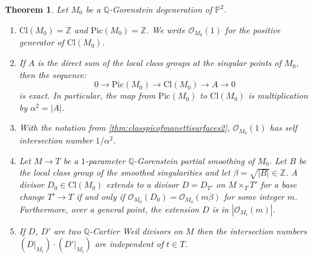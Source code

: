 \documentclass[11pt]{article}
\theoremstyle{plain}
\newtheorem{theorem}{Theorem}[section]
\theoremstyle{definition}
\newcommand\PP{{\mathbb{P}}}
\newcommand\QQ{{\mathbb Q}}
\newcommand\ZZ{{\mathbb Z}}
\newcommand\Oc{{\mathcal O}}
\newcommand\Cl{{\mathrm{Cl}}}
\newcommand\Pic{{\mathrm{Pic}}}
\begin{document}
\begin{theorem}\label{thm:classpicofmanettisurfaces} Let $M_0$ be a $\QQ$-Gorenstein degeneration of $\PP^2$.
\begin{enumerate}
\item\label{thm:classpicofmanettisurfaces1}
$\Cl(M_0)=\ZZ$ and $\Pic(M_0)=\ZZ$. We write $\Oc_{M_0}(1)$ for the positive generator of $\Cl(M_0)$.
\item\label{thm:classpicofmanettisurfaces2}
If $A$ is the direct sum of the local class groups at the singular points of $M_0$, then the sequence:
\[
0\to \Pic(M_0)\to \Cl(M_0)\to A\to 0
\]
is exact. In particular, the map from $\Pic(M_0)$ to $\Cl(M_0)$ is multiplication by $\alpha^2=|A|$.
\item\label{thm:classpicofmanettisurfaces3}
With the notation from \eqref{thm:classpicofmanettisurfaces2}, $\Oc_{M_0}(1)$ has self intersection number $1/\alpha^2$.
\item\label{thm:classpicofmanettisurfaces4}
Let $M \to T$ be a $1$-parameter $\QQ$-Gorenstein partial smoothing of $M_0$. Let $B$ be the local class group of the smoothed singularities and let $\beta=\sqrt{|B|}\in \ZZ$. A divisor $D_0\in \Cl(M_0)$ extends to a divisor $D = D_{T'}$ on $M \times_T T'$ for a base change $T' \to T$ if and only if $\Oc_{M_0}(D_0) = \Oc_{M_0}(m \beta)$ for some integer $m$. Furthermore, over a general point, the extension $D$ is in $|\Oc_{M_t}(m)|$.
\item\label{thm:classpicofmanettisurfaces5}
If $D$, $D'$ are two $\QQ$-Cartier Weil divisors on $M$ then the intersection numbers $(D|_{M_t})\cdot (D'|_{M_t})$ are independent of $t\in T$.
\end{enumerate}
\end{theorem}
\end{document}
